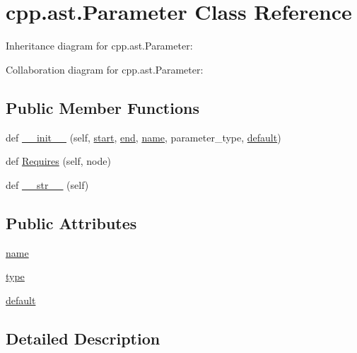 \hypertarget{classcpp_1_1ast_1_1_parameter}{}\section{cpp.\+ast.\+Parameter Class Reference}
\label{classcpp_1_1ast_1_1_parameter}


Inheritance diagram for cpp.\+ast.\+Parameter\+:


Collaboration diagram for cpp.\+ast.\+Parameter\+:
\subsection*{Public Member Functions}
\begin{DoxyCompactItemize}
\item 
def \hyperlink{classcpp_1_1ast_1_1_parameter_a4fe27f559d44adac9e9b5898ba76c5b3}{\+\_\+\+\_\+init\+\_\+\+\_\+} (self, \hyperlink{classcpp_1_1ast_1_1_node_a7b2aa97e6a049bb1a93aea48c48f1f44}{start}, \hyperlink{classcpp_1_1ast_1_1_node_a3c5e5246ccf619df28eca02e29d69647}{end}, \hyperlink{classcpp_1_1ast_1_1_parameter_aae0375fb0ded8fa9090feea6bdff2784}{name}, parameter\+\_\+type, \hyperlink{classcpp_1_1ast_1_1_parameter_a4ceae2ac87d82c5542c4e7385eb4c97e}{default})
\item 
def \hyperlink{classcpp_1_1ast_1_1_parameter_a4bc5c17a0d606d35be40cb4c2c1a67a6}{Requires} (self, node)
\item 
def \hyperlink{classcpp_1_1ast_1_1_parameter_aabfbabb3c744a0da4a012ceb4299947a}{\+\_\+\+\_\+str\+\_\+\+\_\+} (self)
\end{DoxyCompactItemize}
\subsection*{Public Attributes}
\begin{DoxyCompactItemize}
\item 
\hyperlink{classcpp_1_1ast_1_1_parameter_aae0375fb0ded8fa9090feea6bdff2784}{name}
\item 
\hyperlink{classcpp_1_1ast_1_1_parameter_a5eed090000c41551a10c21f175ad33e3}{type}
\item 
\hyperlink{classcpp_1_1ast_1_1_parameter_a4ceae2ac87d82c5542c4e7385eb4c97e}{default}
\end{DoxyCompactItemize}


\subsection{Detailed Description}


